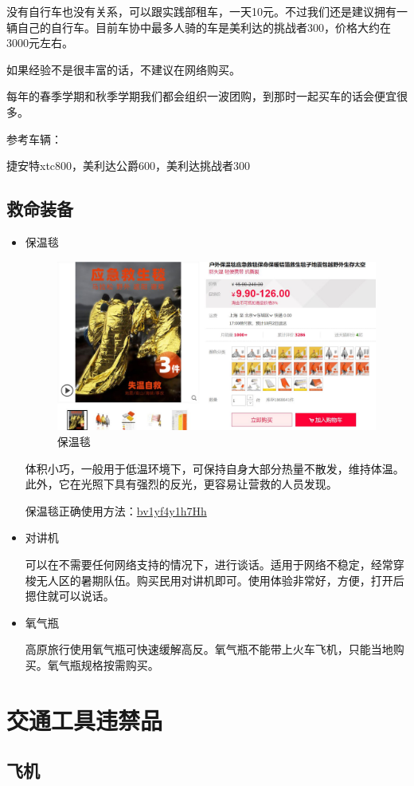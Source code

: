 \documentclass{ctexbook}
\begin{document}
    没有自行车也没有关系，可以跟实践部租车，一天10元。不过我们还是建议拥有一辆自己的自行车。目前车协中最多人骑的车是美利达的挑战者300，价格大约在3000元左右。

    如果经验不是很丰富的话，不建议在网络购买。

    每年的春季学期和秋季学期我们都会组织一波团购，到那时一起买车的话会便宜很多。

    参考车辆：

    捷安特xtc800，美利达公爵600，美利达挑战者300
\section{救命装备}
\begin{itemize}
    \item 保温毯
\begin{figure}[H]
    \centering
    \includegraphics[width=0.7\linewidth]{fig/保温毯.jpg}
    \caption{保温毯}
\end{figure}

体积小巧，一般用于低温环境下，可保持自身大部分热量不散发，维持体温。此外，它在光照下具有强烈的反光，更容易让营救的人员发现。

保温毯正确使用方法：\href{https://www.bilibili.com/video/BV1yf4y1h7Hh}{bv1yf4y1h7Hh}
\item 对讲机

可以在不需要任何网络支持的情况下，进行谈话。适用于网络不稳定，经常穿梭无人区的暑期队伍。购买民用对讲机即可。使用体验非常好，方便，打开后摁住就可以说话。

\item 氧气瓶

高原旅行使用氧气瓶可快速缓解高反。氧气瓶不能带上火车飞机，只能当地购买。氧气瓶规格按需购买。
\end{itemize}
\chapter{交通工具违禁品}
\section{飞机}
\end{document}
